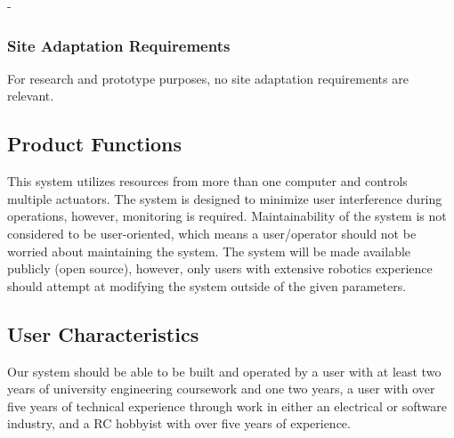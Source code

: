 -\documentclass[compsoc,draftclsnofoot,onecolumn,10pt]{IEEEtran}
\begin{document}
\subsubsection{Site Adaptation Requirements}
For research and prototype purposes, no site adaptation requirements are relevant. 

\subsection{Product Functions} %
This system utilizes resources from more than one computer and controls multiple actuators. 
The system is designed to minimize user interference during operations, however, monitoring is required.
Maintainability of the system is not considered to be user-oriented, which means a user/operator should not be worried about maintaining the system. 
The system will be made available publicly (open source), however, only users with extensive robotics experience should attempt at modifying the system outside of the given parameters.



%

\subsection{User Characteristics} %
Our system should be able to be built and operated by a user with at least two 
years of university engineering coursework and one two years, a user with over 
five years of technical experience through work in either an electrical or software 
industry, and a RC hobbyist with over five years of experience. 
\end{document}
